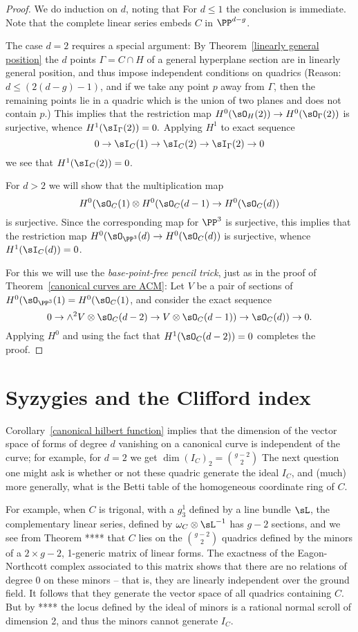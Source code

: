 \begin{proof} We do induction on $d$, noting that
For $d\leq 1$ the conclusion is immediate. Note that the complete linear series
embeds $C$ in $\PP^{d-g}$. 

The case $d=2$ requires a special argument: By Theorem~\ref{linearly general position} the $d$ points $\Gamma = C\cap H$ of a
general hyperplane section are in linearly general position, and thus impose independent conditions on quadrics
(Reason: $d\leq (2(d-g)-1)$, and if we take any point $p$ away from $\Gamma$, then the remaining points lie in a
quadric which is the union of two planes and does not contain $p$.) This implies that
the restriction map $H^0(\sO_H(2)) \to H^0(\sO_\Gamma(2))$ is surjective, whence $H^1(\sI_\Gamma(2)) = 0.$
Applying $H^1$ to exact sequence 
$$
0\to \sI_C(1) \to \sI_C(2) \to \sI_\Gamma(2) \to 0
$$
we see that $H^1(\sI_C(2))=0$.

For $d>2$ we will show that the multiplication map
$$
H^0(\sO_C(1) \otimes H^0(\sO_C(d-1)\to H^0(\sO_{C}(d))
$$
is surjective. Since the corresponding map for $\PP^3$ is surjective, this implies that
the restriction map
$H^0(\sO_{\PP^3}(d)\to H^0(\sO_{C}(d))$
is surjective, whence $H^1(\sI_{C}(d)) = 0$.

For this we will use the \emph{base-point-free pencil trick}, just as in the proof of Theorem~\ref{canonical curves are ACM}:
Let $V$ be a pair of sections of $H^0(\sO_{\PP^3}(1) = H^0(\sO_C(1)$, and consider the exact sequence
$$
0\to \wedge^2V \otimes \sO_C(d-2) \to V\otimes \sO_{C}(d-1))\to \sO_{C}(d))\to 0.
$$
Applying $H^0$ and using the fact that $H^1(\sO_C(d-2)) = 0$ completes the proof.
\end{proof}

\section{Syzygies and the Clifford index}


Corollary~\ref{canonical hilbert function} implies that the dimension of the vector space of forms of degree $d$
vanishing on a canonical curve is independent of the curve; for example, for $d=2$ we get
$
\dim ({I_{C}})_{2} = {g-2\choose 2}
$
The next question one might ask is whether or not these quadric generate the ideal $I_{C}$, and (much) more generally, what is the 
Betti table of the homogeneous coordinate ring of $C$.

 For example,
when $C$ is trigonal, with a $g^{1}_{3}$ defined by a line bundle $\sL$, the complementary linear series,
defined by $\omega_{C}\otimes \sL^{-1}$ has $g-2$ sections, and we see from Theorem ****
that $C$ lies on the ${g-2\choose 2}$ quadrics defined by the minors of a $2\times g-2$, 1-generic matrix of linear forms. The exactness of the Eagon-Northcott complex associated to this matrix shows that there are no relations of degree 0 on these minors -- that is, they are linearly independent over the ground field. It follows that they generate the vector space of all quadrics containing $C$. But by **** the locus defined by
the ideal of minors is a rational normal scroll of dimension 2, and thus the minors cannot generate $I_{C}$.

